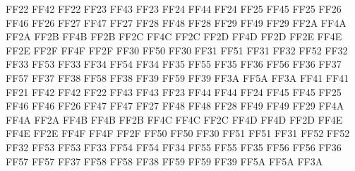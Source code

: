 \setcclcuc FF22 FF42 FF22 %
\setcclcuc FF23 FF43 FF23 %
\setcclcuc FF24 FF44 FF24 %
\setcclcuc FF25 FF45 FF25 %
\setcclcuc FF26 FF46 FF26 %
\setcclcuc FF27 FF47 FF27 %
\setcclcuc FF28 FF48 FF28 %
\setcclcuc FF29 FF49 FF29 %
\setcclcuc FF2A FF4A FF2A %
\setcclcuc FF2B FF4B FF2B %
\setcclcuc FF2C FF4C FF2C %
\setcclcuc FF2D FF4D FF2D %
\setcclcuc FF2E FF4E FF2E %
\setcclcuc FF2F FF4F FF2F %
\setcclcuc FF30 FF50 FF30 %
\setcclcuc FF31 FF51 FF31 %
\setcclcuc FF32 FF52 FF32 %
\setcclcuc FF33 FF53 FF33 %
\setcclcuc FF34 FF54 FF34 %
\setcclcuc FF35 FF55 FF35 %
\setcclcuc FF36 FF56 FF36 %
\setcclcuc FF37 FF57 FF37 %
\setcclcuc FF38 FF58 FF38 %
\setcclcuc FF39 FF59 FF39 %
\setcclcuc FF3A FF5A FF3A %
\setcclcuc FF41 FF41 FF21 %
\setcclcuc FF42 FF42 FF22 %
\setcclcuc FF43 FF43 FF23 %
\setcclcuc FF44 FF44 FF24 %
\setcclcuc FF45 FF45 FF25 %
\setcclcuc FF46 FF46 FF26 %
\setcclcuc FF47 FF47 FF27 %
\setcclcuc FF48 FF48 FF28 %
\setcclcuc FF49 FF49 FF29 %
\setcclcuc FF4A FF4A FF2A %
\setcclcuc FF4B FF4B FF2B %
\setcclcuc FF4C FF4C FF2C %
\setcclcuc FF4D FF4D FF2D %
\setcclcuc FF4E FF4E FF2E %
\setcclcuc FF4F FF4F FF2F %
\setcclcuc FF50 FF50 FF30 %
\setcclcuc FF51 FF51 FF31 %
\setcclcuc FF52 FF52 FF32 %
\setcclcuc FF53 FF53 FF33 %
\setcclcuc FF54 FF54 FF34 %
\setcclcuc FF55 FF55 FF35 %
\setcclcuc FF56 FF56 FF36 %
\setcclcuc FF57 FF57 FF37 %
\setcclcuc FF58 FF58 FF38 %
\setcclcuc FF59 FF59 FF39 %
\setcclcuc FF5A FF5A FF3A %

\endinput
